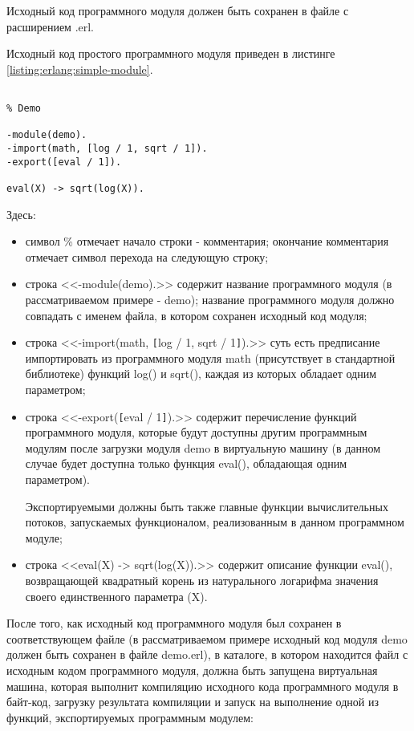 \begin{itemize}
	Исходный код программного модуля должен быть сохранен в файле с расширением .erl.
	
	Исходный код простого программного модуля приведен в листинге \ref{listing:erlang:simple-module}.

\begin{lstlisting}

% Demo

-module(demo).
-import(math, [log / 1, sqrt / 1]).
-export([eval / 1]).

eval(X) -> sqrt(log(X)).

\end{lstlisting}
\mylistingend

	Здесь:

	\begin{itemize}

		\item символ \% отмечает начало строки - комментария; окончание комментария отмечает символ перехода на следующую строку;
		\item строка <<-module(demo).>> содержит название программного модуля (в рассматриваемом примере - demo); название программного модуля должно совпадать с именем файла, в котором сохранен исходный код модуля;
		\item строка <<-import(math, \verb|[|log / 1, sqrt / 1\verb|]|).>> суть есть предписание импортировать из программного модуля math (присутствует в стандартной библиотеке) функций log() и sqrt(), каждая из которых обладает одним параметром;
		\item строка <<-export(\verb|[|eval / 1\verb|]|).>> содержит перечисление функций программного модуля, которые будут доступны другим программным модулям после загрузки модуля demo в виртуальную машину (в данном случае будет доступна только функция eval(), обладающая одним параметром).

		Экспортируемыми должны быть также главные функции вычислительных потоков, запускаемых функционалом, реализованным в данном программном модуле;

		\item строка <<eval(X) -> sqrt(log(X)).>> содержит описание функции eval(), возвращающей квадратный корень из натурального логарифма значения своего единственного параметра (X).

	\end{itemize}

	После того, как исходный код программного модуля был сохранен в соответствующем файле (в рассматриваемом примере исходный код модуля demo должен быть сохранен в файле demo.erl), в каталоге, в котором находится файл с исходным кодом программного модуля, должна быть запущена виртуальная машина, которая выполнит компиляцию исходного кода программного модуля в байт-код, загрузку результата компиляции и запуск на выполнение одной из функций, экспортируемых программным модулем:


\end{itemize}
